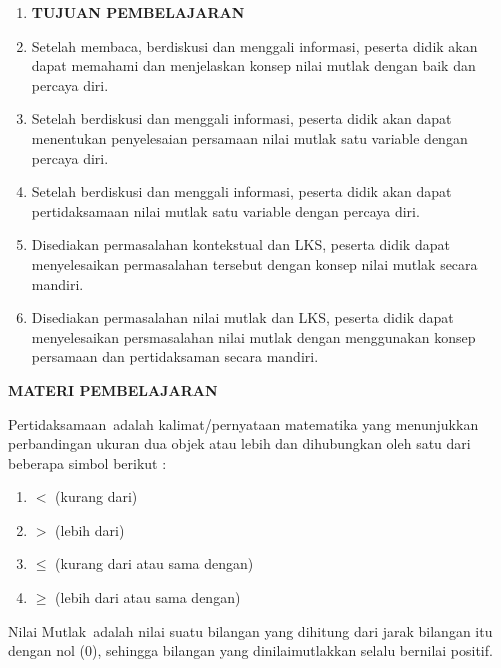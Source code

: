 \documentclass[11pt,fleqn]{book} %
\begin{document}
\noindent \textbf{}

\begin{enumerate}
\item \textbf{ TUJUAN PEMBELAJARAN }

\item \textbf{ }Setelah membaca, berdiskusi dan menggali informasi, peserta didik akan dapat memahami dan menjelaskan konsep nilai mutlak dengan baik dan percaya diri.

\item  Setelah berdiskusi dan menggali informasi, peserta didik akan dapat menentukan penyelesaian persamaan nilai mutlak satu variable dengan percaya diri.

\item  Setelah berdiskusi dan menggali informasi, peserta didik akan dapat pertidaksamaan nilai mutlak satu variable dengan percaya diri.

\item  Disediakan permasalahan kontekstual dan LKS, peserta didik dapat menyelesaikan permasalahan tersebut dengan konsep nilai mutlak secara mandiri.

\item  Disediakan permasalahan nilai mutlak dan LKS, peserta didik dapat menyelesaikan persmasalahan nilai mutlak dengan menggunakan konsep persamaan dan pertidaksaman secara mandiri.
\end{enumerate}

\noindent 

\noindent \textbf{MATERI PEMBELAJARAN}

\noindent Pertidaksamaan~adalah kalimat/pernyataan matematika yang menunjukkan perbandingan ukuran dua objek atau lebih dan dihubungkan oleh satu dari beberapa simbol berikut :

\begin{enumerate}
\item  $<$ (kurang dari)

\item  $>$ (lebih dari)

\item  $\mathrm{\le}$ (kurang dari atau sama dengan)

\item  $\mathrm{\ge}$ (lebih dari atau sama dengan)
\end{enumerate}

\noindent Nilai Mutlak~adalah nilai suatu bilangan yang dihitung dari jarak bilangan itu dengan nol (0), sehingga bilangan yang dinilaimutlakkan selalu bernilai positif.\textbf{}
\end{document}
